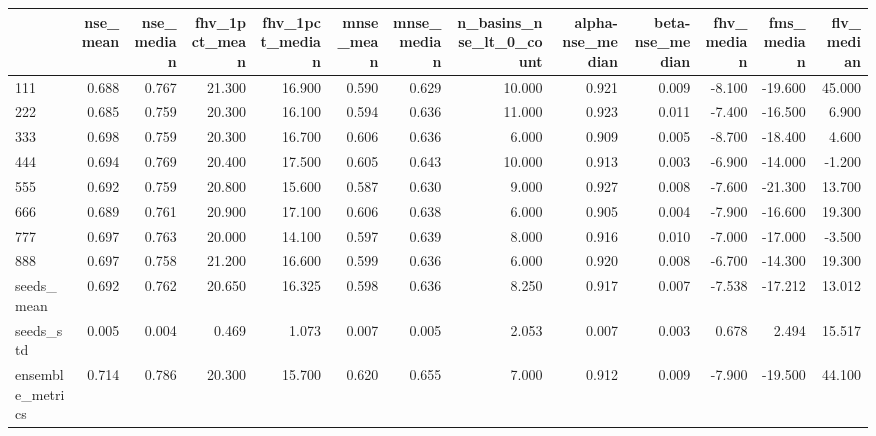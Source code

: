\begin{tabular}{lrrrrrrrrrrrr}
\toprule
 & nse_mean & nse_median & fhv_1pct_mean & fhv_1pct_median & mnse_mean & mnse_median & n_basins_nse_lt_0_count & alpha-nse_median & beta-nse_median & fhv_median & fms_median & flv_median \\
\midrule
111 & 0.688 & 0.767 & 21.300 & 16.900 & 0.590 & 0.629 & 10.000 & 0.921 & 0.009 & -8.100 & -19.600 & 45.000 \\
222 & 0.685 & 0.759 & 20.300 & 16.100 & 0.594 & 0.636 & 11.000 & 0.923 & 0.011 & -7.400 & -16.500 & 6.900 \\
333 & 0.698 & 0.759 & 20.300 & 16.700 & 0.606 & 0.636 & 6.000 & 0.909 & 0.005 & -8.700 & -18.400 & 4.600 \\
444 & 0.694 & 0.769 & 20.400 & 17.500 & 0.605 & 0.643 & 10.000 & 0.913 & 0.003 & -6.900 & -14.000 & -1.200 \\
555 & 0.692 & 0.759 & 20.800 & 15.600 & 0.587 & 0.630 & 9.000 & 0.927 & 0.008 & -7.600 & -21.300 & 13.700 \\
666 & 0.689 & 0.761 & 20.900 & 17.100 & 0.606 & 0.638 & 6.000 & 0.905 & 0.004 & -7.900 & -16.600 & 19.300 \\
777 & 0.697 & 0.763 & 20.000 & 14.100 & 0.597 & 0.639 & 8.000 & 0.916 & 0.010 & -7.000 & -17.000 & -3.500 \\
888 & 0.697 & 0.758 & 21.200 & 16.600 & 0.599 & 0.636 & 6.000 & 0.920 & 0.008 & -6.700 & -14.300 & 19.300 \\
seeds_mean & 0.692 & 0.762 & 20.650 & 16.325 & 0.598 & 0.636 & 8.250 & 0.917 & 0.007 & -7.538 & -17.212 & 13.012 \\
seeds_std & 0.005 & 0.004 & 0.469 & 1.073 & 0.007 & 0.005 & 2.053 & 0.007 & 0.003 & 0.678 & 2.494 & 15.517 \\
ensemble_metrics & 0.714 & 0.786 & 20.300 & 15.700 & 0.620 & 0.655 & 7.000 & 0.912 & 0.009 & -7.900 & -19.500 & 44.100 \\
\bottomrule
\end{tabular}
